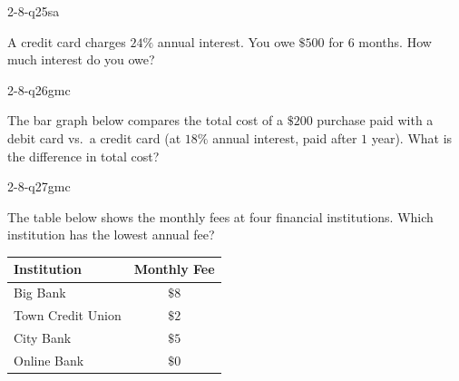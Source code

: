 \begin{practiceQuestion}{2-8-q25}{sa}
\begin{questionText}
A credit card charges $24\%$ annual interest. You owe $\$500$ for $6$ months. How much interest do you owe?
\end{questionText}
\end{practiceQuestion}


\begin{practiceQuestion}{2-8-q26}{gmc}
\begin{questionText}
The bar graph below compares the total cost of a $\$200$ purchase paid with a debit card vs.\ a credit card (at $18\%$ annual interest, paid after $1$ year). What is the difference in total cost?

\begin{center}
\end{center}
\end{questionText}
\end{practiceQuestion}

\begin{practiceQuestion}{2-8-q27}{gmc}
\begin{questionText}
The table below shows the monthly fees at four financial institutions. Which institution has the lowest annual fee?

\begin{center}
\begin{tabular}{|l|c|}
\hline
\textbf{Institution} & \textbf{Monthly Fee} \\
\hline
Big Bank & $\$8$ \\
\hline
Town Credit Union & $\$2$ \\
\hline
City Bank & $\$5$ \\
\hline
Online Bank & $\$0$ \\
\hline
\end{tabular}
\end{center}
\end{questionText}
\end{practiceQuestion}

